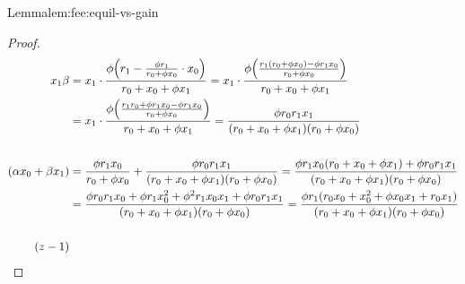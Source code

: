 \begin{proofof}{Lemma}{lem:fee:equil-vs-gain}
\begin{itemize}
\begin{proof}
                \begin{align*}
                    x_1 \valSXb
                    & = x_1 \cdot \frac
                            {\fee \Big ( \ammR[1] - \frac
                                {\fee \ammR[1]}
                                {\ammR[0] + \fee x_0} \cdot x_0
                            \Big )}
                            {\ammR[0] + x_0 + \fee x_1 }
                      = x_1 \cdot \frac
                            {\fee \Big (\frac
                                {\ammR[1] (\ammR[0] + \fee x_0) - \fee \ammR[1] x_0}
                                {\ammR[0] + \fee x_0}
                            \Big )}
                            {\ammR[0] + x_0 + \fee x_1 }
                    \\
                    & = x_1 \cdot \frac
                            {\fee \Big (\frac
                                {\ammR[1] \ammR[0] + \fee \ammR[1] x_0 - \fee \ammR[1] x_0}
                                {\ammR[0] + \fee x_0}
                            \Big )}
                            {\ammR[0] + x_0 + \fee x_1 }
                     = \frac
                            {\fee \ammR[0] \ammR[1] x_1}
                            {(\ammR[0] + x_0 + \fee x_1) (\ammR[0] + \fee x_0)}
                \\
                \\
                    (\valSXa x_0 + \valSXb x_1)
                    & = 
                    \frac{\fee \ammR[1] x_0}{\ammR[0] + \fee x_0} 
                    + 
                    \frac
                        {\fee \ammR[0] \ammR[1] x_1}
                        {(\ammR[0] + x_0 + \fee x_1) (\ammR[0] + \fee x_0)}
                    = 
                    \frac
                        {\fee \ammR[1] x_0 (\ammR[0] + x_0 + \fee x_1) + \fee \ammR[0] \ammR[1] x_1}
                        {(\ammR[0] + x_0 + \fee x_1) (\ammR[0] + \fee x_0)}
                    \\
                    & = 
                    \frac
                        {\fee \ammR[0] \ammR[1] x_0 + \fee \ammR[1] x_0^2 + \fee^2 \ammR[1] x_0 x_1 + \fee \ammR[0] \ammR[1] x_1} 
                        {(\ammR[0] + x_0 + \fee x_1) (\ammR[0] + \fee x_0)}
                    = 
                    \frac
                        {\fee \ammR[1] (\ammR[0] x_0 + x_0^2 + \fee x_0 x_1 + \ammR[0] x_1)} 
                        {(\ammR[0] + x_0 + \fee x_1) (\ammR[0] + \fee x_0)}
                \\
                \\
                    (z-1)

\end{align*}
\end{proof}
\end{itemize}
\end{proofof}
